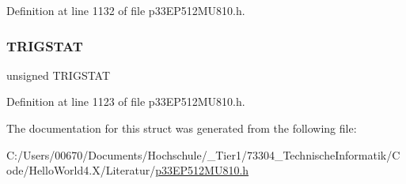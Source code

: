 Definition at line 1132 of file p33\+E\+P512\+M\+U810.\+h.

\mbox{\label{structtag_i_c11_c_o_n2_b_i_t_s_ab379549de54ac93ad4aa73686c34cb7c}} 
\subsubsection{\texorpdfstring{T\+R\+I\+G\+S\+T\+AT}{TRIGSTAT}}
{\footnotesize\ttfamily unsigned T\+R\+I\+G\+S\+T\+AT}



Definition at line 1123 of file p33\+E\+P512\+M\+U810.\+h.



The documentation for this struct was generated from the following file\+:\begin{DoxyCompactItemize}
\item 
C\+:/\+Users/00670/\+Documents/\+Hochschule/\+\_\+\+Tier1/73304\+\_\+\+Technische\+Informatik/\+Code/\+Hello\+World4.\+X/\+Literatur/\hyperlink{p33_e_p512_m_u810_8h}{p33\+E\+P512\+M\+U810.\+h}\end{DoxyCompactItemize}
